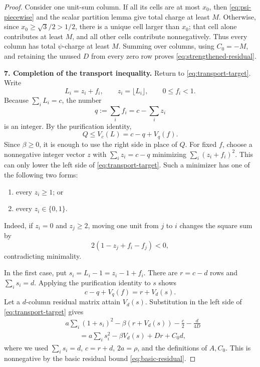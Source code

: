 \documentclass[11pt]{article}
\theoremstyle{remark}
\begin{document}
\begin{proof}
Consider one unit-sum column.  If all its cells are at most $x_0$,
then \eqref{eq:psi-piecewise} and the scalar partition lemma give total
charge at least $M$.  Otherwise, since $x_0\geq\sqrt3/2>1/2$, there
is a unique cell larger than $x_0$; that cell alone contributes at
least $M$, and all other cells contribute nonnegatively.  Thus every
column has total $\psi$-charge at least $M$.  Summing over columns,
using $C_0=-M$, and retaining the unused $D$ from every zero row proves
\eqref{eq:strengthened-residual}.

\medskip
\noindent
\textbf{7. Completion of the transport inequality.}
Return to \eqref{eq:transport-target}.  Write
\[
 L_i=z_i+f_i,\qquad z_i=\lfloor L_i\rfloor,\qquad0\leq f_i<1.
\]
Because $\sum_iL_i=c$, the number
\[
 q:=\sum_i f_i=c-\sum_i z_i
\]
is an integer.  By the purification identity,
\begin{equation}\label{eq:Q-purified-upper}
 Q\leq V_c(L)=c-q+V_q(f).
\end{equation}
Since $\beta\geq0$, it is enough to use the right side in place of
$Q$.  For fixed $f$, choose a nonnegative integer vector $z$ with
$\sum_i z_i=c-q$ minimizing
$\sum_i(z_i+f_i)^2$.  This can only lower the left side of
\eqref{eq:transport-target}.  Such a minimizer has one of the following
two forms:
\begin{enumerate}
 \item every $z_i\geq1$; or
 \item every $z_i\in\{0,1\}$.
\end{enumerate}
Indeed, if $z_i=0$ and $z_j\geq2$, moving one unit from $j$ to
$i$ changes the square sum by
\[
 2(1-z_j+f_i-f_j)<0,
\]
contradicting minimality.

In the first case, put $s_i=L_i-1=z_i-1+f_i$.  There are
$r=c-d$ rows and $\sum_i s_i=d$.  Applying the purification identity
to $s$ shows
\[
 c-q+V_q(f)=r+V_d(s).
\]
Let a $d$-column residual matrix attain $V_d(s)$.  Substitution in
the left side of \eqref{eq:transport-target} gives
\begin{align*}
 &a\sum_i(1+s_i)^2-\beta(r+V_d(s))
       -\frac c2-\frac d{4D}\\
 &\qquad=a\sum_i s_i^2-\beta V_d(s)+Dr+C_0d,
\end{align*}
where we used $\sum_i s_i=d$, $c=r+d$, $2a=\rho$, and the
definitions of $A,C_0$.  This is nonnegative by the basic residual
bound \eqref{eq:basic-residual}.


\end{proof}
\end{document}
